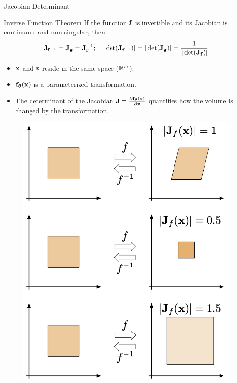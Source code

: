 \documentclass{beamer}
\begin{document}
\begin{frame}{Jacobian Determinant}
	\begin{block}{Inverse Function Theorem}
		If the function $\mathbf{f}$ is invertible and its Jacobian is continuous and non-singular, then
		\vspace{-0.3cm}
		\[
		\mathbf{J}_{\mathbf{f}^{-1}} = \mathbf{J}_{\mathbf{g}} = \mathbf{J}_{\mathbf{f}}^{-1}; \quad |\det (\mathbf{J}_{\mathbf{f}^{-1}})| = |\det (\mathbf{J}_{\mathbf{g}})| = \frac{1}{|\det (\mathbf{J}_{\mathbf{f}})|}
		\]
		\vspace{-0.3cm}
	\end{block}
	\begin{minipage}{0.55\columnwidth}
		\begin{itemize}
			\item $\mathbf{x}$ and $\mathbf{z}$ reside in the same space ($\mathbb{R}^m$).
			\vfill
			\item $\mathbf{f}_{\boldsymbol{\theta}}(\mathbf{x})$ is a parameterized transformation.
			\vfill
			\item The determinant of the Jacobian $\mathbf{J} =\frac{\partial \mathbf{f}_{\boldsymbol{\theta}}(\mathbf{x})}{\partial \mathbf{x}}$ quantifies how the volume is changed by the transformation.
		\end{itemize}
	\end{minipage}%
	\begin{minipage}{0.45\columnwidth}
		\begin{figure}
			\includegraphics[width=0.8\linewidth]{figs/jacobian_det}
		\end{figure}
	\end{minipage}
\end{frame}
\end{document}
